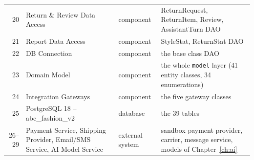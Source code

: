 {\begin{xltabular}{\textwidth}{@{}r L{4.2cm} L{2.4cm} Y@{}}
20 & Return \& Review Data Access & component & ReturnRequest, ReturnItem, Review, AssistantTurn DAO \\
21 & Report Data Access & component & StyleStat, ReturnStat DAO \\
22 & DB Connection & component & the base class \textsf{DAO} \\
23 & Domain Model & component & the whole \texttt{model} layer (41 entity classes, 34 enumerations) \\
24 & Integration Gateways & component & the five gateway classes \\
25 & PostgreSQL 18 -- abc\_fashion\_v2 & database & the 39 tables \\
26--29 & Payment Service, Shipping Provider, Email/SMS Service, AI Model Service & external system & sandbox payment provider, carrier, message service, models of Chapter~\ref{ch:ai} \\
\end{xltabular}
}

